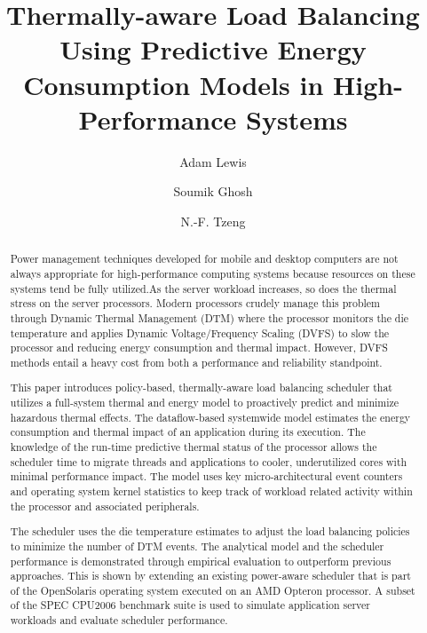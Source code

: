 \documentclass[times,10pt,onecolumn]{article}
\begin{document}
\title{Thermally-aware Load Balancing Using Predictive Energy
  Consumption Models in High-Performance Systems} 
\author[]{Adam Lewis} 
\author[]{Soumik Ghosh} 
\author[]{N.-F. Tzeng}
\maketitle
\newtheorem{defn}{Definition}
\newtheorem{thm}{Theorem}
\thispagestyle{empty}
\doublespacing
\begin{abstract}

 Power management techniques developed for mobile and desktop computers
  are not always appropriate for high-performance computing systems
  because resources on these systems tend be fully utilized.As the
  server workload increases, so does the thermal stress on the
  server processors.  Modern processors crudely manage this problem
  through Dynamic Thermal Management (DTM) where the processor monitors
  the die temperature and applies Dynamic Voltage/Frequency Scaling
  (DVFS) to slow the processor and reducing energy consumption and
  thermal impact.  However, DVFS methods entail a heavy
  cost from both a performance and reliability standpoint.

  This paper introduces policy-based, thermally-aware load balancing
  scheduler that utilizes a full-system thermal and energy model to
  proactively predict and minimize hazardous thermal effects. The
  dataflow-based systemwide model estimates the energy consumption and
  thermal impact of an application during its execution. The knowledge
  of the run-time predictive thermal status of the processor allows the
  scheduler time to migrate threads and applications to cooler,
  underutilized cores with minimal performance impact. The model uses
  key micro-architectural event counters and operating system kernel
  statistics to keep track of workload related activity within the
  processor and associated peripherals.

  The scheduler uses the die temperature estimates to adjust the load
  balancing policies to minimize the number of DTM events.  The
  analytical model and the scheduler performance is demonstrated through
  empirical evaluation to outperform previous approaches. This is shown
  by extending an existing power-aware scheduler that is part of the
  OpenSolaris operating system executed on an AMD Opteron processor.  A
  subset of the SPEC CPU2006 benchmark suite is used to simulate
  application server workloads and evaluate scheduler performance.


\end{abstract}
\end{document}
